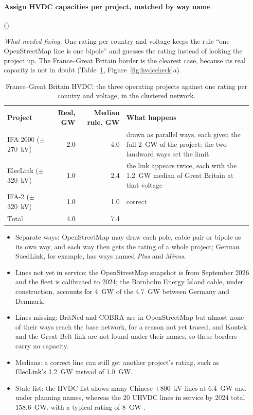 \paragraph{Assign HVDC capacities per project, matched by way name} ()

\textit{What needed fixing.}
One rating per country and voltage keeps the rule ``one OpenStreetMap line is one bipole'' and guesses the rating instead of looking the project up.
The France--Great Britain border is the clearest case, because its real capacity is not in doubt (Table~\ref{tab:hvdcfrgb}, Figure~\ref{fig:hvdccheck}a).

\begin{table}[htb]
  \centering\small
  \caption{France--Great Britain HVDC: the three operating projects against one rating per country and voltage, in the clustered network.}
  \label{tab:hvdcfrgb}
  \begin{tabular}{@{}lrrp{}@{}}
    \toprule
    Project & Real, GW & Median rule, GW & What happens \\
    \midrule
    IFA 2000 ($\pm$\SI{270}{kV}) & 2.0 & 4.0 & drawn as parallel ways, each given the full \SI{2}{GW} of the project; the two landward ways set the limit \\
    ElecLink ($\pm$\SI{320}{kV}) & 1.0 & 2.4 & the link appears twice, each with the \SI{1.2}{GW} median of Great Britain at that voltage \\
    IFA-2 ($\pm$\SI{320}{kV}) & 1.0 & 1.0 & correct \\
    \midrule
    Total & 4.0 & 7.4 & \\
    \bottomrule
  \end{tabular}
\end{table}

\begin{itemize}[nosep,leftmargin=*]
  \item Separate ways: OpenStreetMap may draw each pole, cable pair or bipole as its own way, and each way then gets the rating of a whole project; German SuedLink, for example, has ways named \emph{Plus} and \emph{Minus}.
  \item Lines not yet in service: the OpenStreetMap snapshot is from September 2026 and the fleet is calibrated to 2024; the Bornholm Energy Island cable, under construction, accounts for \SI{4}{GW} of the \SI{4.7}{GW} between Germany and Denmark.
  \item Lines missing: BritNed and COBRA are in OpenStreetMap but almost none of their ways reach the base network, for a reason not yet traced, and Kontek and the Great Belt link are not found under their names, so these borders carry no capacity.
  \item Medians: a correct line can still get another project's rating, such as ElecLink's \SI{1.2}{GW} instead of \SI{1.0}{GW}.
  \item Stale list: the HVDC list shows many Chinese $\pm$\SI{800}{kV} lines at \SI{6.4}{GW} and under planning names, whereas the 20 UHVDC lines in service by 2024 total \SI{158.6}{GW}, with a typical rating of \SI{8}{GW} \citep{wikiuhv}.
\end{itemize}

